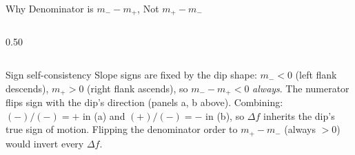 \documentclass[aspectratio=169,10pt]{beamer}
\begin{document}
\begin{frame}{Why Denominator is $m_- - m_+$, Not $m_+ - m_-$}
\begin{columns}[T,totalwidth=\textwidth]
\begin{column}{0.50\textwidth}
\end{column}
\end{columns}
\vspace{0.5em}
\begin{block}{Sign self-consistency}
\scriptsize
Slope signs are fixed by the dip shape: $m_-<0$ (left flank descends),
$m_+>0$ (right flank ascends), so $m_- - m_+ < 0$ \emph{always}. The
numerator flips sign with the dip's direction (panels a, b above).
Combining: $(-)/(-) = +$ in (a) and $(+)/(-) = -$ in (b), so $\Delta f$
inherits the dip's true sign of motion. Flipping the denominator order
to $m_+ - m_-$ (always $>0$) would invert every $\Delta f$.
\end{block}
\end{frame}
\end{document}
